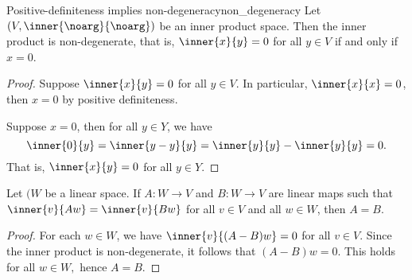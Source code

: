 \begin{proposition}{Positive-definiteness implies non-degeneracy}{non_degeneracy}
    Let \((V, \inner{\noarg}{\noarg})\) be an inner product space. Then the inner product is non-degenerate, that is, \(\inner{x}{y} = 0\) for all \(y \in V\) if and only if \(x = 0\).
\end{proposition}
\begin{proof}
    Suppose \(\inner{x}{y} = 0\) for all \(y \in V\). In particular, \(\inner{x}{x} = 0\), then \(x = 0\) by positive definiteness.

    Suppose \(x = 0\), then for all \(y \in Y\), we have
    \begin{equation*}
        \inner{0}{y} = \inner{y-y}{y} = \inner{y}{y} - \inner{y}{y} = 0.
    \end{equation*}
    That is, \(\inner{x}{y} = 0\) for all \(y \in Y\).
\end{proof}
\begin{corollary}
    Let \((W\) be a linear space. If \(A : W \to V\) and \(B : W \to V\) are linear maps such that \(\inner{v}{Aw} = \inner{v}{Bw}\) for all \(v \in V\) and all \(w \in W\), then \(A = B\).
\end{corollary}
\begin{proof}
    For each \(w \in W\), we have \(\inner{v}{(A - B)w} = 0\) for all \(v \in V\). Since the inner product is non-degenerate, it follows that \((A-B)w = 0\). This holds for all \(w \in W,\) hence \(A = B\).
\end{proof}

